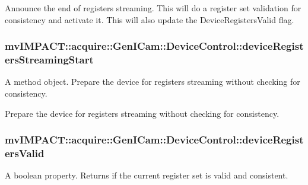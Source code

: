 Announce the end of registers streaming. This will do a register set validation for consistency and activate it. This will also update the Device\+Registers\+Valid flag. \hypertarget{classmv_i_m_p_a_c_t_1_1acquire_1_1_gen_i_cam_1_1_device_control_a081c8a75b02daceb90b8606542f7efaf}{
\subsubsection[{device\+Registers\+Streaming\+Start}]{ mv\+I\+M\+P\+A\+C\+T\+::acquire\+::\+Gen\+I\+Cam\+::\+Device\+Control\+::device\+Registers\+Streaming\+Start}}\label{classmv_i_m_p_a_c_t_1_1acquire_1_1_gen_i_cam_1_1_device_control_a081c8a75b02daceb90b8606542f7efaf}


A method object. Prepare the device for registers streaming without checking for consistency. 

Prepare the device for registers streaming without checking for consistency. \hypertarget{classmv_i_m_p_a_c_t_1_1acquire_1_1_gen_i_cam_1_1_device_control_a25501f7d3647fe89198aa4d5c5044e8b}{
\subsubsection[{device\+Registers\+Valid}]{ mv\+I\+M\+P\+A\+C\+T\+::acquire\+::\+Gen\+I\+Cam\+::\+Device\+Control\+::device\+Registers\+Valid}}\label{classmv_i_m_p_a_c_t_1_1acquire_1_1_gen_i_cam_1_1_device_control_a25501f7d3647fe89198aa4d5c5044e8b}


A boolean property. Returns if the current register set is valid and consistent. 

